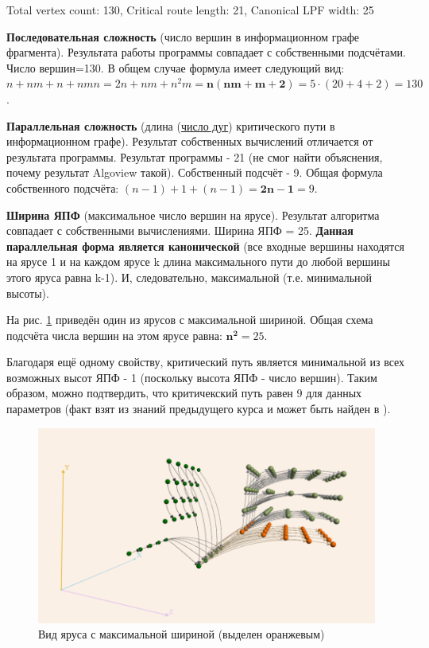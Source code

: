 \documentclass[12pt, fleqn]{article}
\theoremstyle{definition}
\newenvironment{packed_enum}{
\begin{enumerate}
  \setlength{\itemsep}{1pt}
  \setlength{\parskip}{0pt}
  \setlength{\parsep}{0pt}
}{\end{enumerate}}
\begin{document}
Total vertex count: 130, Critical route length: 21, Canonical LPF width: 25
\begin{packed_enum}
 \item \textbf{Последовательная сложность} (число вершин в информационном графе фрагмента). Результата работы программы совпадает с собственными подсчётами. Число вершин=130. 
 В общем случае формула имеет следующий вид: \\ $n + nm + n + nmn = 2n + nm + n^2m = \mathbf{n(nm + m + 2 )} = 5\cdot(20 + 4 + 2) = 130$.
 \item \textbf{Параллельная сложность} (длина (\underline{число дуг}) критического пути в информационном графе). Результат собственных вычислений отличается от результата программы. Результат программы - 21 (не смог найти объяснения, почему результат Algoview такой). Собственный подсчёт - 9. Общая формула собственного подсчёта: $(n - 1) + 1 + (n - 1) = \mathbf{2n - 1} = 9$.

 \item \textbf{Ширина ЯПФ} (максимальное число вершин на ярусе). Результат алгоритма совпадает с собственными вычислениями. Ширина ЯПФ = 25. 
 \textbf{Данная параллельная форма является канонической} (все входные вершины находятся на ярусе 1 и на каждом ярусе k длина максимального пути до любой вершины этого яруса равна k-1). И, следовательно, максимальной (т.е. минимальной высоты).
 
 На рис. \ref{fig:max_lpf} приведён один из ярусов с максимальной шириной. Общая схема подсчёта числа вершин на этом ярусе равна: $\mathbf{n^2} = 25$.
 
 Благодаря ещё одному свойству, критический путь является минимальной из всех возможных высот ЯПФ - 1 (поскольку высота ЯПФ - число вершин). Таким образом, можно подтвердить, что критичекский путь равен 9 для данных параметров (факт взят из знаний предыдущего курса и может быть найден в \cite{Voevodin02}).
 
 \begin{figure}[ht]
\begin{center}
 \includegraphics[scale=1]{max_lpf.png}
 \caption{Вид яруса с максимальной шириной (выделен оранжевым)}
 \label{fig:max_lpf}
\end{center}
\end{figure}


\end{packed_enum}
\end{document}
